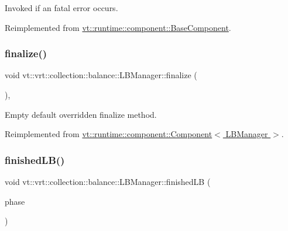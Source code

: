 Invoked if an fatal error occurs. 



Reimplemented from \hyperlink{structvt_1_1runtime_1_1component_1_1_base_component_a43eeed44aa64c77f5491abb4f5a39e9a}{vt\+::runtime\+::component\+::\+Base\+Component}.

\mbox{\label{structvt_1_1vrt_1_1collection_1_1balance_1_1_l_b_manager_a29f02da15bb40857ad425cec22758ac9}} 
\subsubsection{\texorpdfstring{finalize()}{finalize()}}
{\footnotesize\ttfamily void vt\+::vrt\+::collection\+::balance\+::\+L\+B\+Manager\+::finalize (\begin{DoxyParamCaption}{ }\end{DoxyParamCaption})\hspace{0.3cm}{\ttfamily [override]}, {\ttfamily [virtual]}}



Empty default overridden finalize method. 



Reimplemented from \hyperlink{structvt_1_1runtime_1_1component_1_1_component_a098e362de01af6054e5491fba671a959}{vt\+::runtime\+::component\+::\+Component$<$ L\+B\+Manager $>$}.

\mbox{\label{structvt_1_1vrt_1_1collection_1_1balance_1_1_l_b_manager_a7b5455f6e85bb16453971e49ab6450fa}} 
\subsubsection{\texorpdfstring{finished\+L\+B()}{finishedLB()}}
{\footnotesize\ttfamily void vt\+::vrt\+::collection\+::balance\+::\+L\+B\+Manager\+::finished\+LB (\begin{DoxyParamCaption}\item[{\hyperlink{namespacevt_a46ce6733d5cdbd735d561b7b4029f6d7}{Phase\+Type}}]{phase }\end{DoxyParamCaption})\hspace{0.3cm}{\ttfamily [protected]}}



